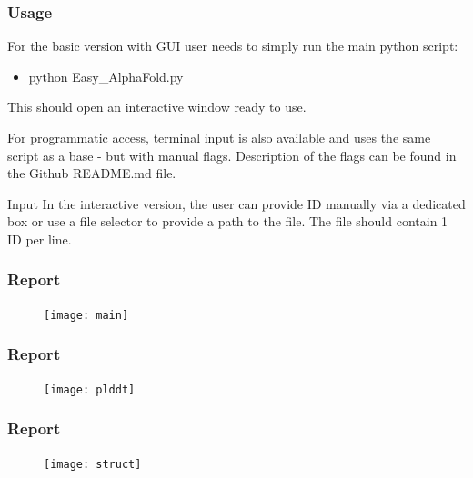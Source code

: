 \documentclass[10pt]{beamer}
\begin{document}
\begin{frame}
\frametitle{Usage}

For the basic version with GUI user needs to simply run the main python script:
\begin{itemize}
\item python Easy\_AlphaFold.py
\end{itemize}

This should open an interactive window ready to use. \newline\newline

For programmatic access, terminal input is also available and uses the same script as a base - but with manual flags.\newline
Description of the flags can be found in the Github README.md file.\newline\newline

Input\newline
In the interactive version, the user can provide ID manually via a dedicated box or use a file selector to provide a path to the file. The file should contain 1 ID per line.
\end{frame}


\begin{frame}
\frametitle{Report}
\begin{figure}[H]
\begin{center}
\texttt{[image: main]}
\end{center}
\end{figure}
\end{frame}

\begin{frame}
\frametitle{Report}
\begin{figure}[H]
\begin{center}
\texttt{[image: plddt]}
\end{center}
\end{figure}
\end{frame}

\begin{frame}
\frametitle{Report}
\begin{figure}[H]
\begin{center}
\texttt{[image: struct]}
\end{center}
\end{figure}
\end{frame}
\end{document}
